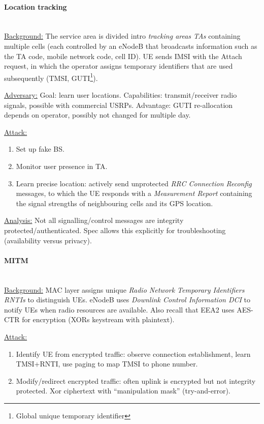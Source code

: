 \paragraph{Location tracking} \mbox{} \\
\underline{Background:}
The service area is divided intro \textit{tracking areas TAs} containing multiple cells (each controlled by an eNodeB that broadcasts information such as the TA code, mobile network code, cell ID).
UE sends IMSI with the Attach request, in which the operator assigns temporary identifiers that are used subsequently (TMSI, GUTI\footnote{Global unique temporary identifier}).

\underline{Adversary:}
Goal: learn user locations.
Capabilities: transmit/receiver radio signals, possible with commercial USRPs.
Advantage: GUTI re-allocation depends on operator, possibly not changed for multiple day.

\underline{Attack:}
\begin{enumerate}
	\item Set up fake BS.
	\item Monitor user presence in TA.
	\item Learn precise location: actively send unprotected \textit{RRC Connection
		      Reconfig} messages, to which the UE responds with a \textit{Measurement Report}
	      containing the signal strengths of neighbouring cells and its GPS location.
\end{enumerate}

\underline{Analysis:}
Not all signalling/control messages are integrity protected/authenticated.
Spec allows this explicitly for troubleshooting (availability versus privacy).

\paragraph{MITM} \mbox{} \\
\underline{Background:}
MAC layer assigns unique \textit{Radio Network Temporary Identifiers RNTIs} to distinguish UEs.
eNodeB uses \textit{Downlink Control Information DCI} to notify UEs when radio resources are available.
Also recall that EEA2 uses AES-CTR for encryption (XORs keystream with plaintext).

\underline{Attack:}
\begin{enumerate}
	\item Identify UE from encrypted traffic: observe connection establishment, learn
	      TMSI+RNTI, use paging to map TMSI to phone number.
	\item Modify/redirect encrypted traffic: often uplink is encrypted but not integrity
	      protected. Xor ciphertext with ``manipulation mask'' (try-and-error).
\end{enumerate}

